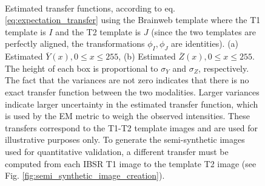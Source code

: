 \begin{figure}[H]
\centering
    \\
    \caption{Estimated transfer functions, according to eq. \eqref{eq:expectation_transfer} using the Brainweb template where the T1 template is $I$ and the T2 template is $J$
    (since the two templates are perfectly aligned, the transformations $\phi_{I}, \phi_{J}$ are identities). (a) Estimated $\overline{Y}(x), 0\leq x \leq 255$, (b) Estimated $\overline{Z}(x), 0\leq x \leq 255$. The height of each box is proportional to $\sigma_{Y}$ and $\sigma_{Z}$, respectively. The fact that the variances are not zero indicates that there is no exact transfer function between the two modalities. Larger variances indicate larger uncertainty in the estimated transfer function, which is used by the EM metric to weigh the observed intensities. These transfers correspond to the T1-T2 template images and are used for illustrative purposes only. To generate the semi-synthetic images used for quantitative validation, a different transfer must be computed from each IBSR T1 image to the template T2 image (see Fig. \ref{fig:semi_synthetic_image_creation}).}
\label{fig:transfers}
\end{figure}



